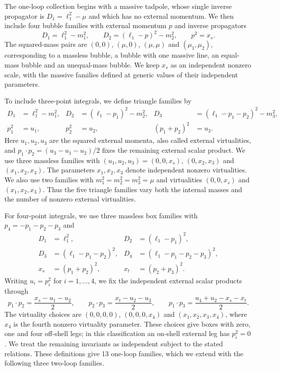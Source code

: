\documentclass[11pt,a4paper]{article}
\begin{document}
The one-loop collection begins with a massive tadpole, whose single
inverse propagator is $D_1=\ell_1^2-\mu$ and which has no external
momentum. We then include four bubble families with external momentum
$p$ and inverse propagators
\begin{equation}
 D_1=\ell_1^2-m_1^2,\qquad
 D_2=(\ell_1-p)^2-m_2^2,\qquad p^2=x_s.
 \label{eq:generated-bubble-family}
\end{equation}
The squared-mass pairs are $(0,0)$, $(\mu,0)$, $(\mu,\mu)$ and
$(\mu_1,\mu_2)$, corresponding to a massless bubble, a bubble with one
massive line, an equal-mass bubble and an unequal-mass bubble.
We keep $x_s$ as an independent nonzero scale, with the massive
families defined at generic values of their independent parameters.

To include three-point integrals, we define triangle families by
\begin{equation}
 \begin{aligned}
 D_1&=\ell_1^2-m_1^2,&
 D_2&=(\ell_1-p_1)^2-m_2^2,&
 D_3&=(\ell_1-p_1-p_2)^2-m_3^2,\\
 p_1^2&=u_1,&p_2^2&=u_2,&(p_1+p_2)^2&=u_3.
 \end{aligned}
 \label{eq:generated-triangle-family}
\end{equation}
Here $u_1,u_2,u_3$ are the squared external momenta, also called
external virtualities, and
$p_1\cdot p_2=(u_3-u_1-u_2)/2$ fixes the remaining external scalar
product. We use three massless families with
$(u_1,u_2,u_3)=(0,0,x_s)$, $(0,x_2,x_3)$ and $(x_1,x_2,x_3)$.
The parameters $x_1,x_2,x_3$ denote independent nonzero virtualities.
We also use two families with $m_1^2=m_2^2=m_3^2=\mu$ and
virtualities $(0,0,x_s)$ and $(x_1,x_2,x_3)$. Thus the five triangle
families vary both the internal masses and the number of nonzero
external virtualities.

For four-point integrals, we use three massless box families with
$p_4=-p_1-p_2-p_3$ and
\begin{equation}
 \begin{aligned}
 D_1&=\ell_1^2,&D_2&=(\ell_1-p_1)^2,\\
 D_3&=(\ell_1-p_1-p_2)^2,&
 D_4&=(\ell_1-p_1-p_2-p_3)^2,\\
 x_s&=(p_1+p_2)^2,&x_t&=(p_2+p_3)^2.
 \end{aligned}
 \label{eq:generated-box-family}
\end{equation}
Writing $u_i=p_i^2$ for $i=1,\ldots,4$, we fix the independent
external scalar products through
\begin{equation}
 p_1\cdot p_2=\frac{x_s-u_1-u_2}{2},\qquad
 p_2\cdot p_3=\frac{x_t-u_2-u_3}{2},\qquad
 p_1\cdot p_3=\frac{u_4+u_2-x_s-x_t}{2}.
 \label{eq:generated-box-kinematics}
\end{equation}
The virtuality choices are $(0,0,0,0)$, $(0,0,0,x_4)$ and
$(x_1,x_2,x_3,x_4)$, where $x_4$ is the fourth nonzero virtuality
parameter. These choices give boxes with zero, one and four off-shell
legs; in this classification an on-shell external leg has $p_i^2=0$.
We treat the remaining invariants as independent subject to the stated
relations. These definitions give 13 one-loop families, which we
extend with the following three two-loop families.
\end{document}
